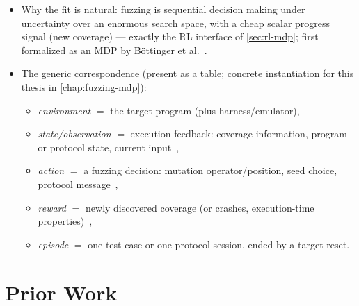 \begin{itemize}
  \item Why the fit is natural: fuzzing is sequential decision making under uncertainty over an
    enormous search space, with a cheap scalar progress signal (new coverage) --- exactly the RL
    interface of \cref{sec:rl-mdp}; first formalized as an MDP by Böttinger et
    al.~\cite{bottinger_deep_2018}.
  \item The generic correspondence (present as a table; concrete instantiation for this thesis in
    \cref{chap:fuzzing-mdp}):
    \begin{itemize}
      \item \emph{environment} $=$ the target program (plus harness/emulator),
      \item \emph{state/observation} $=$ execution feedback: coverage information, program or
        protocol state, current input~\cite{bottinger_deep_2018,borcherding_bandits_2023},
      \item \emph{action} $=$ a fuzzing decision: mutation operator/position, seed choice,
        protocol message~\cite{bottinger_deep_2018,binosi_rainfuzz_2023,borcherding_bandits_2023},
      \item \emph{reward} $=$ newly discovered coverage (or crashes, execution-time
        properties)~\cite{bottinger_deep_2018,wang_syzvegas_2021},
      \item \emph{episode} $=$ one test case or one protocol session, ended by a target reset.
    \end{itemize}
\end{itemize}

\section{Prior Work}\label{sec:rlfuzz-prior-work}

